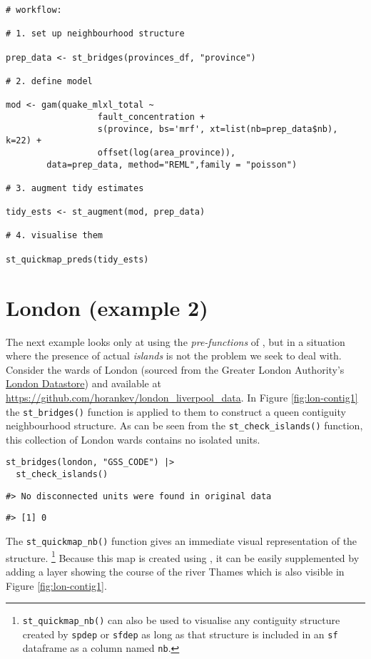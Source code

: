 \begin{verbatim}
# workflow:

# 1. set up neighbourhood structure

prep_data <- st_bridges(provinces_df, "province")

# 2. define model

mod <- gam(quake_mlxl_total ~
                  fault_concentration +
                  s(province, bs='mrf', xt=list(nb=prep_data$nb), k=22) +
                  offset(log(area_province)),
        data=prep_data, method="REML",family = "poisson")

# 3. augment tidy estimates

tidy_ests <- st_augment(mod, prep_data)

# 4. visualise them

st_quickmap_preds(tidy_ests)
\end{verbatim}

\section{London (example 2)}\label{london-example-2}

The next example looks only at using the \emph{pre-functions} of , but in a situation where the presence of actual \emph{islands} is not the problem we seek to deal with. Consider the wards of London (sourced from the Greater London Authority's \href{https://data.london.gov.uk/}{London Datastore}) and available at
\url{https://github.com/horankev/london_liverpool_data}. In Figure \ref{fig:lon-contig1} the \texttt{st\_bridges()}
function is applied to them to construct a queen contiguity
neighbourhood structure. As can be seen from the \texttt{st\_check\_islands()} function, this collection of London wards contains no isolated units.

\begin{verbatim}
st_bridges(london, "GSS_CODE") |>
  st_check_islands()
\end{verbatim}

\begin{verbatim}
#> No disconnected units were found in original data
\end{verbatim}

\begin{verbatim}
#> [1] 0
\end{verbatim}

The \texttt{st\_quickmap\_nb()} function gives an immediate visual representation of the structure. \footnote{\texttt{st\_quickmap\_nb()} can also be used to visualise any contiguity structure created by \texttt{spdep} or \texttt{sfdep} as long as that structure is included in an \texttt{sf} dataframe as a column named \texttt{nb}.} Because this map is created using , it can be easily supplemented by adding a layer showing the course of the river Thames which is also visible in Figure \ref{fig:lon-contig1}.


